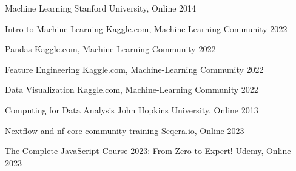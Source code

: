 

\begin{cvhonors}

  \cvhonor
    {Machine Learning} %
    {Stanford University, Online} %
    {}
    {2014} %

  \cvhonor
    {Intro to Machine Learning} %
    {Kaggle.com, Machine-Learning Community} %
    {}
    {2022} %

  \cvhonor
    {Pandas} %
    {Kaggle.com, Machine-Learning Community} %
    {}
    {2022} %

  \cvhonor
    {Feature Engineering} %
    {Kaggle.com, Machine-Learning Community} %
    {}
    {2022} %

  \cvhonor
    {Data Visualization} %
    {Kaggle.com, Machine-Learning Community} %
    {}
    {2022} %

  \cvhonor
    {Computing for Data Analysis} %
    {John Hopkins University, Online} %
    {}
    {2013} %

\cvhonor
    {Nextflow and nf-core community training} %
    {Seqera.io, Online} %
    {} %
    {2023} %

\cvhonor
    {The Complete JavaScript Course 2023: From Zero to Expert!} %
    {Udemy, Online } %
    {}
    {2023} %


\end{cvhonors}
